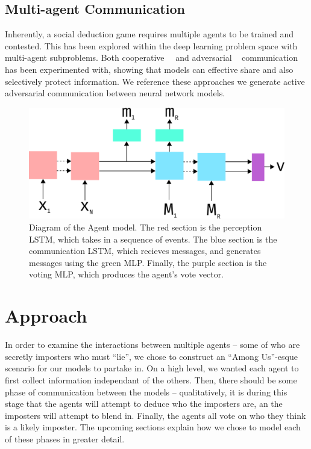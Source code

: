\documentclass[10pt,twocolumn,letterpaper]{article}
\begin{document}
\subsection{Multi-agent Communication}
Inherently, a social deduction game requires multiple agents to be trained and contested.
This has been explored within the deep learning problem space with multi-agent subproblems.
Both cooperative~\cite{DBLP:journals/corr/FoersterAFW16}~\cite{DBLP:journals/corr/FoersterAFW16a} 
and adversarial ~\cite{DBLP:journals/corr/AbadiA16} communication has been experimented with,
showing that models can effective share and also selectively protect information.
We reference these approaches we generate active adversarial communication between 
neural network models.
\begin{figure}
   \begin{center}
      \includegraphics[width=0.8 \textwidth]{img/model.png}
   \end{center}
      \caption{Diagram of the Agent model. The red section is the perception LSTM,
      which takes in a sequence of events. The blue section is the communication
      LSTM, which recieves messages, and generates messages using the green MLP.
      Finally, the purple section is the voting MLP, which produces the agent's
      vote vector.}
   \label{fig:model}
\end{figure}
\section{Approach}
In order to examine the interactions between multiple agents -- some of who are
secretly imposters who must ``lie'', we chose to construct an ``Among Us''-esque scenario
for our models to partake in. On a high level, we wanted each agent to 
first collect information
independant of the others. Then, there should be some phase of communication between the
models -- qualitatively, it is during this stage that the agents will attempt to
deduce who the imposters are, an the imposters will attempt to blend in. Finally, the
agents all vote on who they think is a likely imposter. The upcoming sections
explain how we chose to model each of these phases in greater detail.
\end{document}
